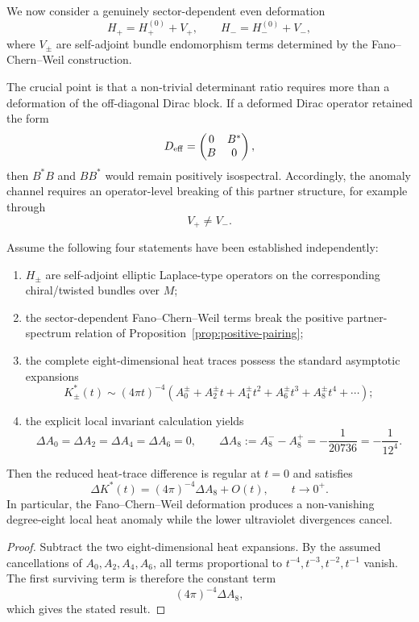 We now consider a genuinely sector-dependent even deformation
\[
H_+=H_+^{(0)}+V_+,
\qquad
H_-=H_-^{(0)}+V_-,
\]
where $V_\pm$ are self-adjoint bundle endomorphism terms determined by the
Fano--Chern--Weil construction.

The crucial point is that a non-trivial determinant ratio requires more than
a deformation of the off-diagonal Dirac block.  If a deformed Dirac operator
retained the form
\[
D_{\rm eff}=
\begin{pmatrix}
0&B^\ast\\
B&0
\end{pmatrix},
\]
then $B^\ast B$ and $BB^\ast$ would remain positively isospectral.
Accordingly, the anomaly channel requires an operator-level breaking of this
partner structure, for example through
\[
V_+\neq V_-.
\]

\begin{theorem}
\label{thm:pairing-breaking-anomaly}
Assume the following four statements have been established independently:

\begin{enumerate}
\item $H_\pm$ are self-adjoint elliptic Laplace-type operators on the
      corresponding chiral/twisted bundles over $M$;
\item the sector-dependent Fano--Chern--Weil terms break the positive
      partner-spectrum relation of Proposition~\ref{prop:positive-pairing};
\item the complete eight-dimensional heat traces possess the standard
      asymptotic expansions
      \[
      K_\pm^\ast(t)\sim
      (4\pi t)^{-4}
      \left(
      A_0^\pm+A_2^\pm t+A_4^\pm t^2+A_6^\pm t^3+A_8^\pm t^4+\cdots
      \right);
      \]
\item the explicit local invariant calculation yields
      \[
      \Delta A_0=\Delta A_2=\Delta A_4=\Delta A_6=0,
      \qquad
      \Delta A_8
      :=
      A_8^- - A_8^+
      =
      -\frac{1}{20736}
      =
      -\frac{1}{12^4}.
      \]
\end{enumerate}

Then the reduced heat-trace difference is regular at $t=0$ and satisfies
\[
\Delta K^\ast(t)
=
(4\pi)^{-4}\Delta A_8+O(t),
\qquad
t\to0^+.
\]
In particular, the Fano--Chern--Weil deformation produces a non-vanishing
degree-eight local heat anomaly while the lower ultraviolet divergences
cancel.
\end{theorem}

\begin{proof}
Subtract the two eight-dimensional heat expansions.  By the assumed
cancellations of $A_0,A_2,A_4,A_6$, all terms proportional to
$t^{-4},t^{-3},t^{-2},t^{-1}$ vanish.  The first surviving term is therefore
the constant term
\[
(4\pi)^{-4}\Delta A_8,
\]
which gives the stated result.
\end{proof}

